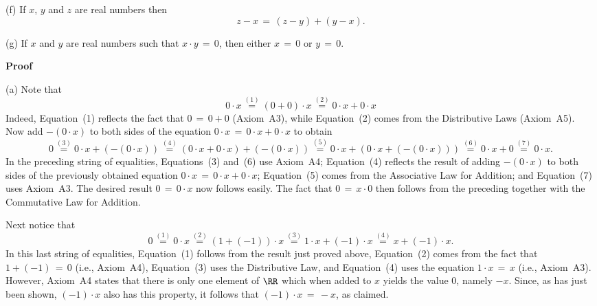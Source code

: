         (f) If $x$, $y$ and $z$ are real numbers then
        \begin{displaymath}
        z-x \,=\, (z-y) + (y-x).
        \end{displaymath}

\V

        (g) If $x$ and $y$ are real numbers such that $x{\cdot}y \,=\, 0$, then either $x \,=\, 0$ or $y \,=\, 0$.

\V

        {\bf Proof}

\V

        (a) Note that
        \begin{displaymath}
        0{\cdot}x \stackrel{(1)}{ \,=\, } (0+0){\cdot}x \stackrel{(2)}{ \,=\, }
        0{\cdot}x + 0{\cdot}x
        \end{displaymath}
    Indeed, Equation~(1) reflects the fact that $0 \,=\, 0+0$ (Axiom~A3), while Equation~(2) comes from the Distributive Laws (Axiom~A5).
    Now add $-(0{\cdot}x)$ to both sides of the equation $0{\cdot}x \,=\, 0{\cdot}x+0{\cdot}x$ to obtain
        \begin{displaymath}
        0 \stackrel{(3)}{ \,=\, } 0{\cdot}x + (-(0{\cdot}x)) \stackrel{(4)}{ \,=\, } (0{\cdot}x + 0{\cdot}x) + (-(0{\cdot}x))
     \stackrel{(5)}{ \,=\, } 0{\cdot}x + (0{\cdot}x + (-(0{\cdot}x)))
     \stackrel{(6)}{ \,=\, } 0{\cdot}x + 0  \stackrel{(7)}{ \,=\, } 0{\cdot}x.
        \end{displaymath}
    In the preceding string of equalities, Equations~(3) and~(6) use Axiom~A4; Equation~(4) reflects the result of adding $-(0{\cdot}x)$ to both sides of the previously obtained equation $0{\cdot}x \,=\, 0{\cdot}x + 0{\cdot}x$;
    Equation~(5) comes from the Associative Law for Addition; and Equation~(7) uses Axiom~A3.
    The desired result $0 \,=\, 0{\cdot}x$ now follows easily. The fact that $0 \,=\, x{\cdot}0$ then follows from the preceding together with the Commutative Law for Addition.

        Next notice that
        \begin{displaymath}
        0 \stackrel{(1)}{ \,=\, } 0{\cdot}x \stackrel{(2)}{ \,=\, }
    (1+(-1)){\cdot}x \stackrel{(3)}{ \,=\, } 1{\cdot}x + (-1){\cdot}x \stackrel{(4)}{ \,=\, } x+(-1){\cdot}x.
        \end{displaymath}
    In this last string of equalities, Equation~(1) follows from the result just proved above,
    Equation~(2) comes from the fact that $1+(-1) \,=\, 0$ (i.e., Axiom~A4), Equation~(3) uses the Distributive Law, and Equation~(4) uses the equation $1{\cdot}x \,=\, x$ (i.e., Axiom~A3).
    However, Axiom~A4 states that there is only one element of ${\RR}$ which when added to $x$ yields the value $0$, namely $-x$.
    Since, as has just been shown, $(-1){\cdot}x$ also has this property, it follows that $(-1){\cdot}x \,=\, -x$, as claimed.

